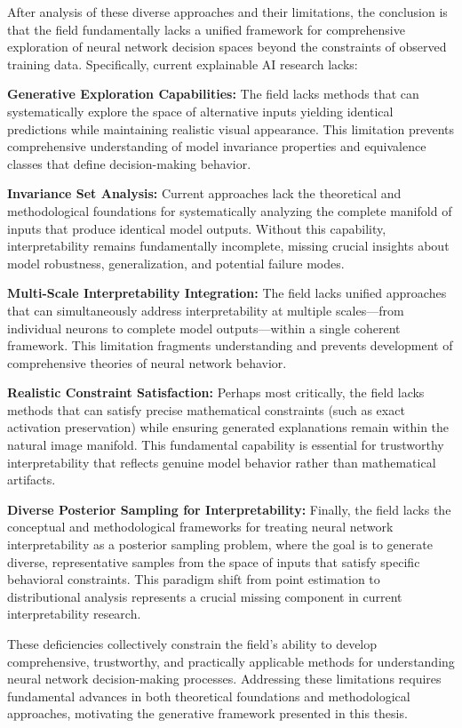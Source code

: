 After analysis of these diverse approaches and their limitations, the conclusion is that the field fundamentally lacks a unified framework for comprehensive exploration of neural network decision spaces beyond the constraints of observed training data. Specifically, current explainable AI research lacks:

\textbf{Generative Exploration Capabilities:} The field lacks methods that can systematically explore the space of alternative inputs yielding identical predictions while maintaining realistic visual appearance. This limitation prevents comprehensive understanding of model invariance properties and equivalence classes that define decision-making behavior.

\textbf{Invariance Set Analysis:} Current approaches lack the theoretical and methodological foundations for systematically analyzing the complete manifold of inputs that produce identical model outputs. Without this capability, interpretability remains fundamentally incomplete, missing crucial insights about model robustness, generalization, and potential failure modes.

\textbf{Multi-Scale Interpretability Integration:} The field lacks unified approaches that can simultaneously address interpretability at multiple scales—from individual neurons to complete model outputs—within a single coherent framework. This limitation fragments understanding and prevents development of comprehensive theories of neural network behavior.

\textbf{Realistic Constraint Satisfaction:} Perhaps most critically, the field lacks methods that can satisfy precise mathematical constraints (such as exact activation preservation) while ensuring generated explanations remain within the natural image manifold. This fundamental capability is essential for trustworthy interpretability that reflects genuine model behavior rather than mathematical artifacts.

\textbf{Diverse Posterior Sampling for Interpretability:} Finally, the field lacks the conceptual and methodological frameworks for treating neural network interpretability as a posterior sampling problem, where the goal is to generate diverse, representative samples from the space of inputs that satisfy specific behavioral constraints. This paradigm shift from point estimation to distributional analysis represents a crucial missing component in current interpretability research.

These deficiencies collectively constrain the field's ability to develop comprehensive, trustworthy, and practically applicable methods for understanding neural network decision-making processes. Addressing these limitations requires fundamental advances in both theoretical foundations and methodological approaches, motivating the generative framework presented in this thesis.
